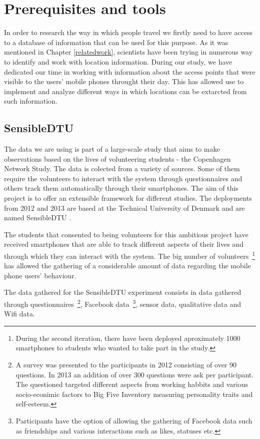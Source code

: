 \chapter{Prerequisites and tools}
In order to research the way in which people travel we firstly need to have
access to a database of information that can be used for this purpose. As it was
mentioned in Chapter \ref{relatedwork}, scientists have been trying in numerous
way to identify and work with location information. During our study, we have
dedicated our time in working with information about the access points that were
visible to the users' mobile phones throught their day. This has allowed use to
implement and analyze different ways in which locations can be extarcted from
such information.

\section{SensibleDTU}
The data we are using is part of a large-scale study that aims to make
observations based on the lives of volunteering students - the Copenhagen
Network Study. The data is colected from a variety of sources. Some of them
require the volunteers to interact with the system through questionnaires and
others track them automatically through their smartphones. The aim of this
project is to offer an extensible framework for different studies. The
deployments from 2012 and 2013 are based at the Technical University of Denmark
and are named SensibleDTU \cite{Stopczynski14m}.

The students that consented to being volunteers for this ambitious project have
received smartphones that are able to track different aspects of their lives and
through which they can interact with the system. The big number of
volunteers~\footnote{During the second iteration, there have been deployed
aproximately 1000 smartphones to students who wanted to take part in the study.}
has allowed the gathering of a considerable amount of data regarding the mobile
phone users' behaviour.

The data gathered for the SensibleDTU experiment consists in data gathered
through questionnaires~\footnote{A survey was presented to the participants in
2012 consisting of over 90 questions. In 2013 an addition of over 300 questions
were ask per participant. The questioned targeted different aspects from working
habbits and various socio-econimic factors to Big Five Inventory measuring
personality traits \cite{John99} and self-esteem.}, Facebook
data~\footnote{Participants have the option of allowing the gathering of
Facebook data such as friendships and various interactions such as likes,
statuses etc.}, sensor data, qualitative data and Wifi data.

